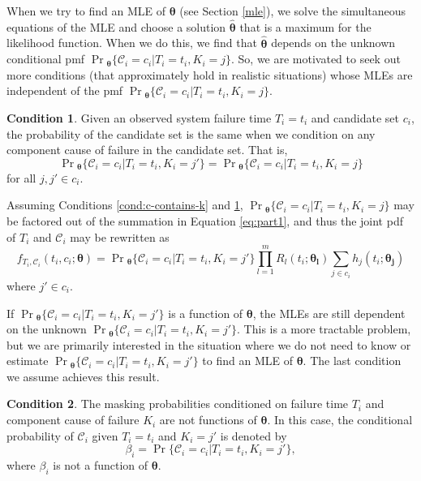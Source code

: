 \documentclass[
]{article}
\theoremstyle{definition}
\newtheorem{condition}{Condition}
\theoremstyle{plain}
\theoremstyle{definition}
\theoremstyle{definition}
\theoremstyle{definition}
\theoremstyle{definition}
\theoremstyle{remark}
\begin{document}
When we try to find an MLE of \(\boldsymbol{\theta}\) (see Section \ref{mle}), we
solve the simultaneous equations of the MLE and choose a solution
\(\hat{\boldsymbol{\theta}}\) that is a maximum for the likelihood function.
When we do this, we find that \(\hat{\boldsymbol{\theta}}\) depends on the unknown
conditional pmf \(\Pr{}_{\!\boldsymbol{\theta}}\{\mathcal{C}_i=c_i|T_i=t_i,K_i=j\}\).
So, we are motivated to seek out more conditions (that approximately hold in
realistic situations) whose MLEs are independent of the pmf
\(\Pr{}_{\!\boldsymbol{\theta}}\{\mathcal{C}_i=c_i|T_i=t_i,K_i=j\}\).

\begin{condition}
\label{cond:equal-prob-failure-cause}
Given an observed system failure time $T_i=t_i$ and candidate set $c_i$,
the probability of the candidate set is the same when we condition on any
component cause of failure in the candidate set. That is,
$$
\Pr{}_{\!\boldsymbol{\theta}}\{\mathcal{C}_i=c_i|T_i=t_i,K_i=j'\} =
    \Pr{}_{\!\boldsymbol{\theta}}\{\mathcal{C}_i=c_i|T_i=t_i,K_i=j\}
$$
for all $j, j' \in c_i$.
\end{condition}

Assuming Conditions \ref{cond:c-contains-k} and
\ref{cond:equal-prob-failure-cause},
\(\Pr{}_{\!\boldsymbol{\theta}}\{\mathcal{C}_i=c_i|T_i=t_i,K_i=j\}\) may be factored out of the
summation in Equation \eqref{eq:part1}, and thus the joint pdf of \(T_i\) and
\(\mathcal{C}_i\) may be rewritten as
\[
f_{T_i,\mathcal{C}_i}(t_i,c_i;\boldsymbol{\theta}) =
    \Pr{}_{\!\boldsymbol{\theta}}\{\mathcal{C}_i=c_i|T_i=t_i,K_i=j'\} \prod_{l=1}^m R_l(t_i;\boldsymbol{\theta_l})
    \sum_{j \in c_i} h_j(t_i;\boldsymbol{\theta_j})
\]
where \(j' \in c_i\).

If \(\Pr{}_{\!\boldsymbol{\theta}}\{\mathcal{C}_i=c_i|T_i=t_i,K_i=j'\}\) is a function of
\(\boldsymbol{\theta}\), the MLEs are still dependent on the unknown
\(\Pr{}_{\!\boldsymbol{\theta}}\{\mathcal{C}_i=c_i|T_i=t_i,K_i=j'\}\).
This is a more tractable problem, but we are primarily interested in the
situation where we do not need to know or estimate
\(\Pr{}_{\!\boldsymbol{\theta}}\{\mathcal{C}_i=c_i|T_i=t_i,K_i=j'\}\) to find an MLE of
\(\boldsymbol{\theta}\). The last condition we assume achieves this result.

\begin{condition}
\label{cond:masked-indept-theta}
The masking probabilities conditioned on failure time $T_i$ and component cause
of failure $K_i$ are not functions of $\boldsymbol{\theta}$. In this case, the conditional
probability of $\mathcal{C}_i$ given $T_i=t_i$ and $K_i=j'$ is denoted by
$$
\beta_i = \Pr\{\mathcal{C}_i=c_i | T_i=t_i, K_i=j'\},
$$
where $\beta_i$ is not a function of $\boldsymbol{\theta}$.
\end{condition}
\end{document}

